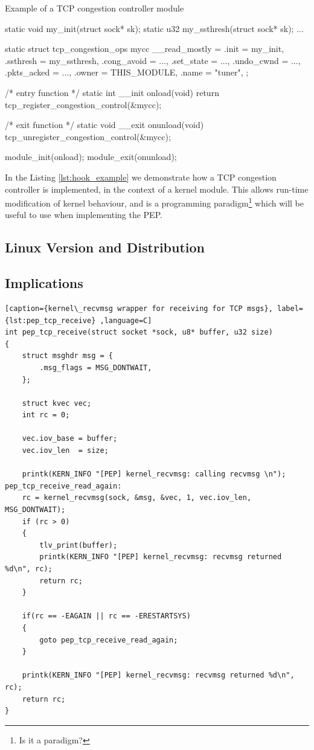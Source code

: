 \documentclass[a4paper,english, 11pt]{report}
\begin{document}
\begin{autonumlstlisting}[label=lst:hook_example]{Example of a TCP congestion controller module}

static void my_init(struct sock* sk);
static u32 my_ssthresh(struct sock* sk);
...

static struct tcp_congestion_ops mycc __read_mostly = {
  .init           = my_init,
  .ssthresh       = my_ssthresh,
  .cong_avoid     = ...,
  .set_state      = ...,
  .undo_cwnd      = ...,
  .pkts_acked     = ...,
  .owner          = THIS_MODULE,
  .name           = "tuner",
};

/* entry function */
static int __init onload(void) {
    return tcp_register_congestion_control(&mycc);
}

/* exit function */
static void __exit onunload(void) {
    tcp_unregister_congestion_control(&mycc);
}

module_init(onload);
module_exit(onunload);
\end{autonumlstlisting}
In the Listing \ref{lst:hook_example} we demonstrate how a TCP congestion controller is implemented, in the context of a kernel module. This allows run-time modification of kernel behaviour, and is a programming paradigm\footnote{Is it a paradigm?} which will be useful to use when implementing the PEP.


\subsection{Linux Version and Distribution}

\subsection{Implications}

\begin{lstlisting}[caption={kernel\_recvmsg wrapper for receiving for TCP msgs}, label={lst:pep_tcp_receive} ,language=C]
int pep_tcp_receive(struct socket *sock, u8* buffer, u32 size)
{
	struct msghdr msg = {
		.msg_flags = MSG_DONTWAIT,
	};

	struct kvec vec;
	int rc = 0;

	vec.iov_base = buffer;
	vec.iov_len  = size;

	printk(KERN_INFO "[PEP] kernel_recvmsg: calling recvmsg \n");
pep_tcp_receive_read_again:
	rc = kernel_recvmsg(sock, &msg, &vec, 1, vec.iov_len, MSG_DONTWAIT);
	if (rc > 0)
	{
		tlv_print(buffer);
		printk(KERN_INFO "[PEP] kernel_recvmsg: recvmsg returned %d\n", rc);
		return rc;
	}

	if(rc == -EAGAIN || rc == -ERESTARTSYS)
	{
		goto pep_tcp_receive_read_again;
	}

	printk(KERN_INFO "[PEP] kernel_recvmsg: recvmsg returned %d\n", rc);
	return rc;
}
\end{lstlisting}
\end{document}
